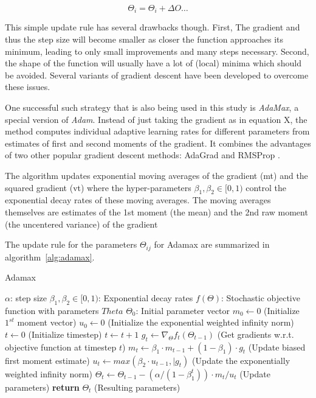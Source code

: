 \begin{equation}
    \Theta_i = \Theta_i + \Delta O \dots
\end{equation}

This simple update rule has several drawbacks though. First, The gradient and thus the step size will become smaller as 
closer the function approaches its minimum, leading to only small improvements and many steps necessary.
Second, the shape of the function will usually have a lot of (local) minima which should be avoided.
Several variants of gradient descent have been developed to overcome these issues.

One successful such strategy that is also being used in this study is \textit{AdaMax}, a special version 
of \textit{Adam}. Instead of just taking the gradient as in equation X, the method computes individual adaptive learning rates for
different parameters from estimates of first and second moments of the gradient. It combines the advantages
of two other popular gradient descent methods: AdaGrad \cite{} and RMSProp \cite{}. 

The algorithm updates exponential moving averages of the gradient (mt) and the squared gradient
(vt) where the hyper-parameters $\beta_1, \beta_2 \in [0, 1)$ control the exponential decay rates of these moving
averages. The moving averages themselves are estimates of the 1st moment (the mean) and the
2nd raw moment (the uncentered variance) of the gradient

The update rule for the parameters $\Theta_{ij}$ for Adamax are summarized in 
algorithm~\ref{alg:adamax}.

\begin{algorithm}
    \label{alg:adamax}
    \caption{Adamax}\label{euclid}
    \begin{algorithmic}[1]
        \Require $\alpha$: step size
        \Require $\beta_1, \beta_2 \in [0,1)$: Exponential decay rates
        \Require $f(\Theta)$: Stochastic objective function with parameters $Theta$
        \Require $\Theta_0$: Initial parameter vector
        \State $m_0 \gets 0$ (Initialize $1^{st}$ moment vector)
        \State $u_0 \gets 0$ (Initialize the exponential weighted infinity norm)
        \State $t \gets 0$ (Initialize timestep)
            \State $t\gets t+1$
            \State $g_t \gets \nabla_{\Theta}f_t(\Theta_{t-1})$ (Get gradients w.r.t. objective function at timestep $t$)
            \State $m_t \gets \beta_1 \cdot m_{t-1} + (1-\beta_1) \cdot g_t$ (Update biased first moment estimate)
            \State $u_t \gets max(\beta_2 \cdot u_{t-1}, \vert{g_t})$ (Update the exponentially weighted infinity norm)
            \State $\Theta_t \gets \Theta_{t-1} - (\alpha/ (1-\beta_1^t)) \cdot m_t/u_t$ (Update parameters)
        \EndWhile
        \State \textbf{return} $\Theta_t$ (Resulting parameters)
    \end{algorithmic}
\end{algorithm}


